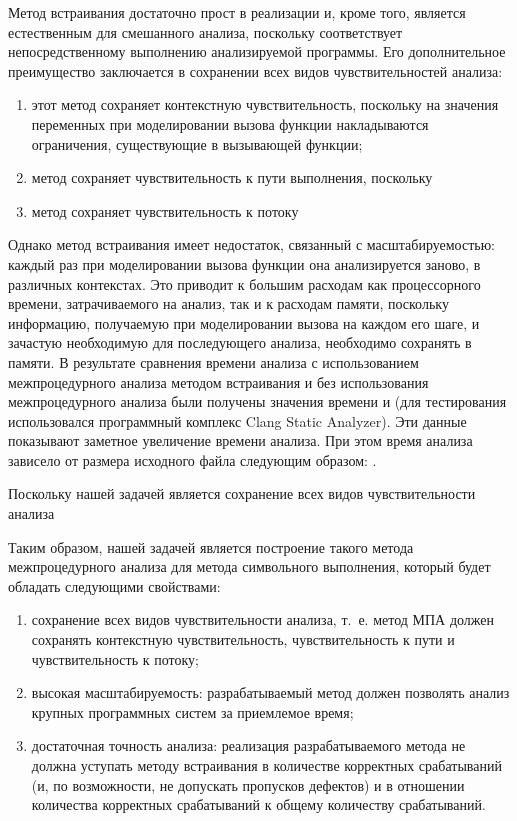 Метод встраивания достаточно прост в реализации и, кроме того, является естественным для смешанного анализа, поскольку соответствует непосредственному выполнению анализируемой программы. Его дополнительное преимущество заключается в сохранении всех видов чувствительностей анализа:

\begin{enumerate}
 \item этот метод сохраняет контекстную чувствительность, поскольку на значения переменных при моделировании вызова функции накладываются ограничения, существующие в вызывающей функции;
 \item метод сохраняет чувствительность к пути выполнения, поскольку 
 \item метод сохраняет чувствительность к потоку 
\end{enumerate}


Однако метод встраивания имеет недостаток, связанный с масштабируемостью: каждый раз при моделировании вызова функции она анализируется заново, в различных контекстах. Это приводит к большим расходам как процессорного времени, затрачиваемого на анализ, так и к расходам памяти, поскольку информацию, получаемую при моделировании вызова на каждом его шаге, и зачастую необходимую для последующего анализа, необходимо сохранять в памяти. В результате сравнения времени анализа с использованием межпроцедурного анализа методом встраивания и без использования межпроцедурного анализа были получены значения времени  и  (для тестирования использовался программный комплекс Clang Static Analyzer). Эти данные показывают заметное увеличение времени анализа. При этом время анализа зависело от размера исходного файла следующим образом: .

Поскольку нашей задачей является сохранение всех видов чувствительности анализа


\todo{!!!}


Таким образом, нашей задачей является построение такого метода межпроцедурного анализа для метода символьного выполнения, который будет обладать следующими свойствами:

\begin{enumerate}
 \item сохранение всех видов чувствительности анализа, т.~е. метод МПА должен сохранять контекстную чувствительность, чувствительность к пути и чувствительность к потоку;
 \item высокая масштабируемость: разрабатываемый метод должен позволять анализ крупных программных систем за приемлемое время;
 \item достаточная точность анализа: реализация разрабатываемого метода не должна уступать методу встраивания в количестве корректных срабатываний (и, по возможности, не допускать пропусков дефектов) и в отношении количества корректных срабатываний к общему количеству срабатываний.
\end{enumerate}


